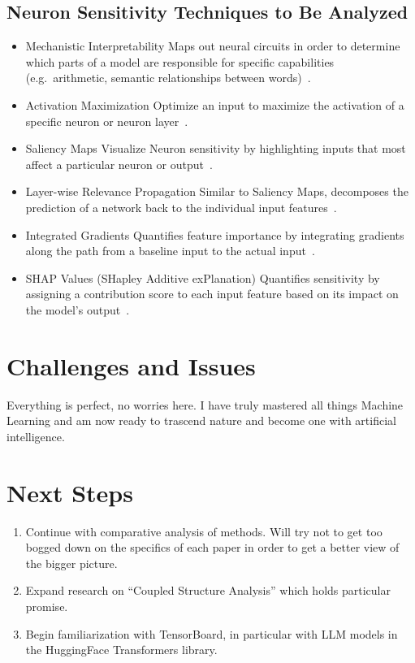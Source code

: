 \documentclass{article}
\begin{document}
    \subsection{Neuron Sensitivity Techniques to Be Analyzed}\label{subsec:neuron-sensitivity-techniques-to-be-analyzed}
    \begin{itemize}
        \item Mechanistic Interpretability
        \subitem Maps out neural circuits in order to determine which parts of a model are responsible for specific capabilities (e.g.\ arithmetic, semantic relationships between words)~\cite{singh2024rethinking}.
        \item Activation Maximization
        \subitem Optimize an input to maximize the activation of a specific neuron or neuron layer~\cite{erhan2009visualizing}.
        \item Saliency Maps
        \subitem Visualize Neuron sensitivity by highlighting inputs that most affect a particular neuron or output~\cite{hsu2023explainable}.
        \item Layer-wise Relevance Propagation
        \subitem Similar to Saliency Maps, decomposes the prediction of a network back to the individual input features~\cite{jia2022interpreting}.
        \item Integrated Gradients
        \subitem Quantifies feature importance by integrating gradients along the path from a baseline input to the actual input~\cite{sundararajan2017axiomatic}.
        \item SHAP Values (SHapley Additive exPlanation)
        \subitem Quantifies sensitivity by assigning a contribution score to each input feature based on its impact on the model’s output~\cite{nohara2022explanation}.
    \end{itemize}

    \section{Challenges and Issues}\label{sec:challenges-and-issues}
    Everything is perfect, no worries here.
    I have truly mastered all things Machine Learning and am now ready to trascend nature and become one with artificial intelligence.

    \section{Next Steps}\label{sec:next-steps}
    \begin{enumerate}
        \item Continue with comparative analysis of methods.
        Will try not to get too bogged down on the specifics of each paper in order to get a better view of the bigger picture.
        \item Expand research on ``Coupled Structure Analysis'' which holds particular promise.
        \item Begin familiarization with TensorBoard, in particular with LLM models in the HuggingFace Transformers library.
    \end{enumerate}
\end{document}
